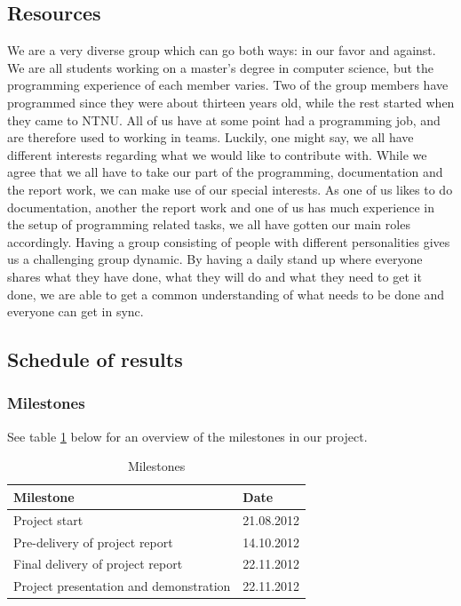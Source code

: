 \newpage

\subsection{Resources}
We are a very diverse group which can go both ways: in our favor and against. We are all students working on a master's degree in computer science, but the programming experience of each member varies. Two of the group members have
programmed since they were about thirteen years old, while the rest started when they came to NTNU. All of us have at some point had a programming job, and are therefore used to working in teams.
\newline
\newline
Luckily, one might say, we all have different interests regarding what we would like to contribute with. While we agree that we all have to take our part of the programming, documentation and the report work, we can make use of our special interests. As one of us likes to do documentation, another the report work and one of us has much experience in the setup of programming related tasks, we all have gotten our main roles accordingly.
\newline
\newline
Having a group consisting of people with different personalities gives us a challenging group dynamic. By having a daily stand up where everyone shares what they have done, what they will do and what they need to get it done, we are able to get a common understanding of what needs to be done and everyone can get in sync.

\subsection{Schedule of results}

\subsubsection*{Milestones}
See table \ref{tab:milestones} below for an overview of the milestones in our project.
\begin{table}[h!]
\begin{center}
\begin{tabular}{l|l} \hline
\textbf{Milestone} & \textbf{Date} \\ \hline \hline
Project start &  21.08.2012\\ 
Pre-delivery of project report & 14.10.2012\\ 
Final delivery of project report & 22.11.2012\\
Project presentation and demonstration & 22.11.2012\\ \hline
\end{tabular}
\end{center}
\caption{Milestones} \label{tab:milestones}
\end{table}

